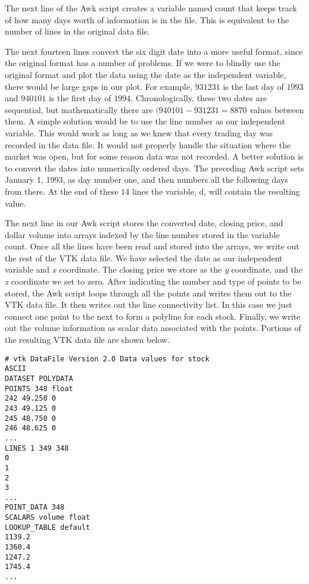 The next line of the Awk script creates a variable named count that keeps track of how many days worth of information is in the file. This is equivalent to the number of lines in the original data file.

The next fourteen lines convert the six digit date into a more useful format, since the original format has a number of problems. If we were to blindly use the original format and plot the data using the date as the independent variable, there would be large gaps in our plot. For example,  $931231$ is the last day of $1993$ and $940101$ is the first day of $1994$. Chronologically, these two dates are sequential, but mathematically there are $(940101 - 931231 = 8870$ values between them. A simple solution would be to use the line number as our independent variable. This would work as long as we knew that every trading day was recorded in the data file. It would not properly handle the situation where the market was open, but for some reason data was not recorded. A better solution is to convert the dates into numerically ordered days. The preceding Awk script sets January 1, 1993, as day number one, and then numbers all the following days from there. At the end of these $14$ lines the variable, d, will contain the resulting value.

The next line in our Awk script stores the converted date, closing price, and dollar volume  into arrays indexed by the line number stored in the variable count. Once all the lines have been read and stored into the arrays, we write out the rest of the VTK data file. We have selected the date as our independent variable and \emph{x} coordinate. The closing price we store as the \emph{y} coordinate, and the \emph{z} coordinate we set to zero. After indicating the number and type of points to be stored, the Awk script loops through all the points and writes them out to the VTK data file. It then writes out the line connectivity list. In this case we just connect one point to the next to form a polyline for each stock. Finally, we write out the volume information as scalar data associated with the points. Portions of the resulting VTK data file are shown below.

\begin{lstlisting}[numbers=none]
# vtk DataFile Version 2.0 Data values for stock
ASCII
DATASET POLYDATA
POINTS 348 float
242 49.250 0
243 49.125 0
245 48.750 0
246 48.625 0
...
LINES 1 349 348
0
1
2
3
...
POINT_DATA 348
SCALARS volume float
LOOKUP_TABLE default
1139.2
1360.4
1247.2
1745.4
...
\end{lstlisting}


